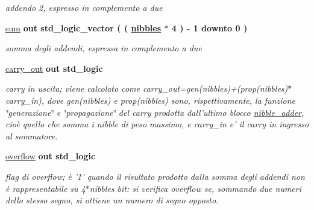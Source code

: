 \begin{DoxyCompactItemize}
\begin{DoxyCompactList}\small\item\em addendo 2, espresso in complemento a due \end{DoxyCompactList}\item 
\hyperlink{group___carry_loockahead_ga1b4798a9e96bb32e9c08ce68e24e7871}{sum}  {\bfseries {\bfseries \textcolor{vhdlchar}{out}\textcolor{vhdlchar}{ }}} {\bfseries \textcolor{vhdlchar}{std\+\_\+logic\+\_\+vector}\textcolor{vhdlchar}{ }\textcolor{vhdlchar}{(}\textcolor{vhdlchar}{ }\textcolor{vhdlchar}{(}\textcolor{vhdlchar}{ }\textcolor{vhdlchar}{ }\textcolor{vhdlchar}{ }\textcolor{vhdlchar}{ }{\bfseries \hyperlink{group___carry_loockahead_ga0b63b586531492d0fa882246cca071c1}{nibbles}} \textcolor{vhdlchar}{$\ast$}\textcolor{vhdlchar}{ } \textcolor{vhdldigit}{4} \textcolor{vhdlchar}{ }\textcolor{vhdlchar}{)}\textcolor{vhdlchar}{ }\textcolor{vhdlchar}{-\/}\textcolor{vhdlchar}{ } \textcolor{vhdldigit}{1} \textcolor{vhdlchar}{ }\textcolor{vhdlchar}{downto}\textcolor{vhdlchar}{ }\textcolor{vhdlchar}{ } \textcolor{vhdldigit}{0} \textcolor{vhdlchar}{ }\textcolor{vhdlchar}{)}\textcolor{vhdlchar}{ }} 
\begin{DoxyCompactList}\small\item\em somma degli addendi, espressa in complemento a due \end{DoxyCompactList}\item 
\hyperlink{group___carry_loockahead_ga851aaea297bdc862fba5478c4bf0e214}{carry\+\_\+out}  {\bfseries {\bfseries \textcolor{vhdlchar}{out}\textcolor{vhdlchar}{ }}} {\bfseries \textcolor{vhdlchar}{std\+\_\+logic}\textcolor{vhdlchar}{ }} 
\begin{DoxyCompactList}\small\item\em carry in uscita; viene calcolato come carry\+\_\+out=gen(nibbles)+(prop(nibbles)$\ast$carry\+\_\+in), dove gen(nibbles) e prop(nibbles) sono, rispettivamente, la funzione \char`\"{}generazione\char`\"{} e \char`\"{}propagazione\char`\"{} del carry prodotta dall'ultimo blocco \hyperlink{classnibble__adder}{nibble\+\_\+adder}, cioè quello che somma i nibble di peso massimo, e carry\+\_\+in e' il carry in ingresso al sommatore. \end{DoxyCompactList}\item 
\hyperlink{group___carry_loockahead_ga9650307dde287e0bcfa1e26370c006c2}{overflow}  {\bfseries {\bfseries \textcolor{vhdlchar}{out}\textcolor{vhdlchar}{ }}} {\bfseries \textcolor{vhdlchar}{std\+\_\+logic}\textcolor{vhdlchar}{ }} 
\begin{DoxyCompactList}\small\item\em flag di overflow; è '1' quando il risultato prodotto dalla somma degli addendi non è rappresentabile su 4$\ast$nibbles bit\+: si verifica overflow se, sommando due numeri dello stesso segno, si ottiene un numero di segno opposto. \end{DoxyCompactList}\end{DoxyCompactItemize}


